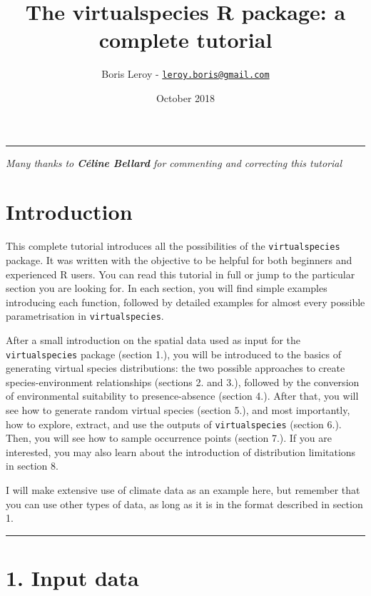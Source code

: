 \documentclass[]{article}
\title{The virtualspecies R package: a complete tutorial}
\author{Boris Leroy -
\href{mailto:leroy.boris@gmail.com}{\nolinkurl{leroy.boris@gmail.com}}}
\date{October 2018}
\begin{document}
\maketitle

{
\setcounter{tocdepth}{2}
\tableofcontents
}

\begin{center}\rule{0.5\linewidth}{\linethickness}\end{center}

\emph{Many thanks to \textbf{Céline Bellard} for commenting and
correcting this tutorial}

\section{Introduction}\label{introduction}

This complete tutorial introduces all the possibilities of the
\texttt{virtualspecies} package. It was written with the objective to be
helpful for both beginners and experienced R users. You can read this
tutorial in full or jump to the particular section you are looking for.
In each section, you will find simple examples introducing each
function, followed by detailed examples for almost every possible
parametrisation in \texttt{virtualspecies}.

After a small introduction on the spatial data used as input for the
\texttt{virtualspecies} package (section 1.), you will be introduced to
the basics of generating virtual species distributions: the two possible
approaches to create species-environment relationships (sections 2. and
3.), followed by the conversion of environmental suitability to
presence-absence (section 4.). After that, you will see how to generate
random virtual species (section 5.), and most importantly, how to
explore, extract, and use the outputs of \texttt{virtualspecies}
(section 6.). Then, you will see how to sample occurrence points
(section 7.). If you are interested, you may also learn about the
introduction of distribution limitations in section 8.

I will make extensive use of climate data as an example here, but
remember that you can use other types of data, as long as it is in the
format described in section 1.

\begin{center}\rule{0.5\linewidth}{\linethickness}\end{center}

\section{1. Input data}\label{input-data}
\end{document}
